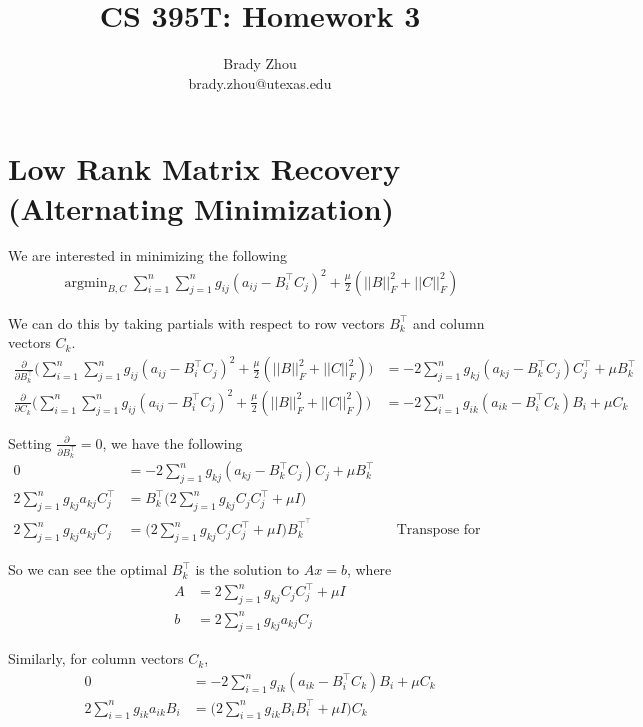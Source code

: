 \documentclass[a4paper]{article}
\title{CS 395T: Homework 3}
\author{Brady Zhou \\ brady.zhou@utexas.edu}
\DeclareMathOperator*{\argmin}{argmin}
\begin{document}
\maketitle

\section{Low Rank Matrix Recovery (Alternating Minimization)}

We are interested in minimizing the following
\begin{align*}
\argmin_{B, C} \sum_{i=1}^n \sum_{j=1}^n g_{ij} (a_{ij} - B_i^\intercal C_j)^2 + \frac{\mu}{2} (||B||_F^2 + ||C||_F^2)
\end{align*}

We can do this by taking partials with respect to row vectors $B_k^\intercal$ and column vectors $C_k$.
\begin{align*}
\frac{\partial}{\partial B_k^\intercal} \Big( \sum_{i=1}^n \sum_{j=1}^n g_{ij} (a_{ij} - B_i^\intercal C_j)^2 + \frac{\mu}{2} (||B||_F^2 + ||C||_F^2) \Big)
&= -2 \sum_{j=1}^n g_{kj} (a_{kj} - B_k^\intercal C_j) C_j^\intercal + \mu B_k^\intercal \\
\frac{\partial}{\partial C_k} \Big( \sum_{i=1}^n \sum_{j=1}^n g_{ij} (a_{ij} - B_i^\intercal C_j)^2 + \frac{\mu}{2} (||B||_F^2 + ||C||_F^2) \Big)
&= -2 \sum_{i=1}^n g_{ik} (a_{ik} - B_i^\intercal C_k) B_i + \mu C_k
\end{align*}

Setting $\frac{\partial}{\partial B_k^\intercal} = 0$, we have the following
\begin{align*}
0 &= -2 \sum_{j=1}^n g_{kj} (a_{kj} - B_k^\intercal C_j) C_j + \mu B_k^\intercal \\
2 \sum_{j=1}^n g_{kj} a_{kj} C_j^\intercal &= B_k^\intercal \Big(2 \sum_{j=1}^n g_{kj} C_j C_j^\intercal + \mu I \Big) \\
2 \sum_{j=1}^n g_{kj} a_{kj} C_j &= \Big(2 \sum_{j=1}^n g_{kj} C_j C_j^\intercal + \mu I \Big) B_k^{\intercal^\intercal} && \text{Transpose for sanity.}
\end{align*}

So we can see the optimal $B_k^\intercal$ is the solution to $Ax = b$, where 
\begin{align*}
A &= 2 \sum_{j=1}^n g_{kj} C_j C_j^\intercal + \mu I \\
b &= 2 \sum_{j=1}^n g_{kj} a_{kj} C_j
\end{align*}

Similarly, for column vectors $C_k$,
\begin{align*}
0 &= -2 \sum_{i=1}^n g_{ik} (a_{ik} - B_i^\intercal C_k) B_i + \mu C_k \\
2 \sum_{i=1}^n g_{ik} a_{ik} B_i &= \Big( 2 \sum_{i=1}^n g_{ik} B_i B_i^\intercal + \mu I \Big) C_k
\end{align*}
\end{document}
